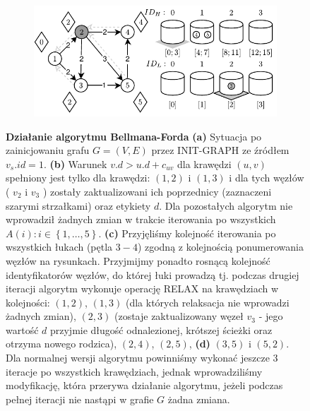 \begin{figure}[!htbp]
\begin{subfigure}[b]{0.45\textwidth}
		\caption{}
	\end{subfigure}
	\qquad
	\begin{subfigure}[b]{0.45\textwidth}
		\includegraphics[width=\textwidth]{Chapter_II/4/d.pdf}
		\caption{}
	\end{subfigure}%
	\caption{\textbf{Działanie algorytmu Bellmana-Forda} \textbf{(a)} Sytuacja po zainicjowaniu grafu $G = \left( V, E \right)$ przez \textsf{INIT-GRAPH} ze źródłem $v_{s}.id = 1$. \textbf{(b)} Warunek $ v.d > u.d + c_{uv} $ dla krawędzi $ \left( u, v \right) $ spełniony jest tylko dla krawędzi: $ \left( 1, 2 \right) $ i $ \left( 1, 3 \right) $ i dla tych węzłów ( $v_{2}$ i $v_{3}$ ) zostały zaktualizowani ich poprzednicy (zaznaczeni szarymi strzałkami) oraz etykiety $d$. Dla pozostałych algorytm nie wprowadził żadnych zmian w trakcie iterowania po wszystkich $ A \left( i \right) : i \in \left\{ 1, \ldots, 5\right\}$. \textbf{(c)} Przyjęliśmy kolejność iterowania po wszystkich łukach (pętla $3-4$) zgodną z kolejnością ponumerowania węzłów na rysunkach. Przyjmijmy ponadto rosnącą kolejność identyfikatorów węzłów, do której łuki prowadzą tj. podczas drugiej iteracji algorytm wykonuje operację \textsf{RELAX} na krawędziach w kolejności: $ \left( 1, 2 \right) $, $ \left( 1, 3 \right) $ (dla których relaksacja nie wprowadzi żadnych zmian), $ \left( 2, 3 \right) $ (zostaje zaktualizowany węzeł $v_{3}$ - jego wartość $d$ przyjmie długość odnalezionej, krótszej ścieżki oraz otrzyma nowego rodzica), $ \left( 2, 4 \right) $, $ \left( 2, 5 \right) $, \textbf{(d)} $ \left( 3, 5 \right) $ i $ \left( 5, 2 \right) $. Dla normalnej wersji algorytmu powinniśmy wykonać jeszcze 3 iteracje po wszystkich krawędziach, jednak wprowadziliśmy modyfikację, która przerywa działanie algorytmu, jeżeli podczas pełnej iteracji nie nastąpi w grafie $G$ żadna zmiana.} \label{fig:exampleBellmanFord}
\end{figure}
	
